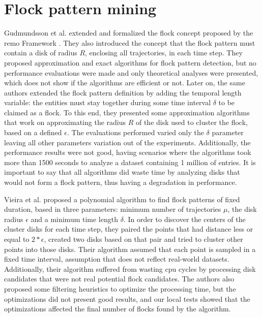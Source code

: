 \section{Flock pattern mining}
\label{sec:rel_flocks}
Gudmundsson et al. \citep{gudefficient} \citep{gudlongest} extended and formalized the flock concept proposed by the
\ac{remo} Framework \citep{remo}. They also introduced the concept that the flock pattern must contain a disk of radius
$R$, enclosing all trajectories, in each time step. They proposed approximation and exact algorithms for flock pattern
detection, but no performance evaluations were made and only theoretical analyses were presented, which does not show if
the algorithms are efficient or not. Later on, the same authors \citep{gudlongest} extended the flock pattern definition
by adding the temporal length variable: the entities must stay together during some time interval $\delta$ to be claimed
as a flock. To this end, they presented some approximation algorithms that work on approximating the radius $R$ of the
disk used to cluster the flock, based on a defined $\epsilon$. The evaluations performed \citep{gudlongest} varied only
the $\delta$ parameter leaving all other parameters variation out of the experiments. Additionally, the performance
results were not good, having scenarios where the algorithms took more than 1500 seconds to analyze a dataset containing
1 million of entries. It is important to say that all algorithms did waste time by analyzing disks that would not form a
flock pattern, thus having a degradation in performance.

Vieira et al. \citep{vieira} proposed a polynomial algorithm to find flock patterns of fixed duration, based in three
parameters: minimum number of trajectories $\mu$, the disk radius $\epsilon$ and a minimum time length $\delta$.  In
order to discover the centers of the cluster disks for each time step, they paired the points that had distance less or
equal to $2*\epsilon$, created two disks based on that pair and tried to cluster other points into those disks. Their
algorithm assumed that each point is sampled in a fixed time interval, assumption that does not reflect real-world
datasets. Additionally, their algorithm suffered from wasting \ac{cpu} cycles by processing disk candidates that were
not real potential flock candidates. The authors also proposed some filtering heuristics to optimize the processing
time, but the optimizations did not present good results, and our local tests showed that the optimizations affected the
final number of flocks found by the algorithm.


